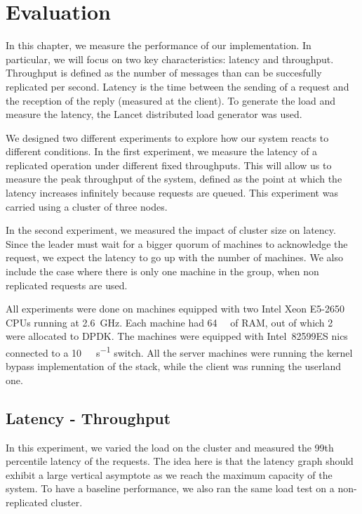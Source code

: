 \chapter{Evaluation}
\label{chap:evaluation}

In this chapter, we measure the performance of our implementation.
In particular, we will focus on two key characteristics: latency and throughput.
Throughput is defined as the number of messages than can be succesfully replicated per second.
Latency is the time between the sending of a request and the reception of the reply (measured at the client).
To generate the load and measure the latency, the Lancet distributed load generator\cite{lancet} was used.

We designed two different experiments to explore how our system reacts to different conditions.
In the first experiment, we measure the latency of a replicated operation under different fixed throughputs.
This will allow us to measure the peak throughput of the system, defined as the point at which the latency increases infinitely because requests are queued.
This experiment was carried using a cluster of three nodes.

In the second experiment, we measured the impact of cluster size on latency.
Since the leader must wait for a bigger quorum of machines to acknowledge the request, we expect the latency to go up with the number of machines.
We also include the case where there is only one machine in the group, \ie when non replicated requests are used.

All experiments were done on machines equipped with two Intel Xeon E5-2650 CPUs running at \SI{2.6}{\giga\hertz}.
Each machine had \SI{64}{\giga\byte} of RAM, out of which \SI{2}{\giga\byte} were allocated to DPDK.
The machines were equipped with Intel~82599ES \glspl{nic} connected to a \SI{10}{\giga\bit\per\second} switch.
All the server machines were running the kernel bypass implementation of the stack, while the client was running the userland one.

\section{Latency - Throughput}
\label{sec:latency_throughput}

In this experiment, we varied the load on the cluster and measured the 99th percentile latency of the requests.
The idea here is that the latency graph should exhibit a large vertical asymptote as we reach the maximum capacity of the system. 
To have a baseline performance, we also ran the same load test on a non-replicated cluster.

